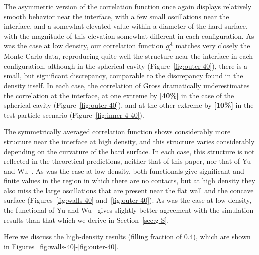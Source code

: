 \documentclass[letterpaper,twocolumn,amsmath,amssymb,jcp,10pt,aip]{revtex4-1}
\newcommand{\red}[1]{{\bf \color{red} #1}}
\newcommand{\fixme}[1]{\red{[#1]}}
\begin{document}
The asymmetric version of the correlation function once again displays
relatively smooth behavior near the interface, with a few small
oscillations near the interface, and a somewhat elevated value within
a diameter of the hard surface, with the magnitude of this elevation
somewhat different in each configuration.  As was the case at low
density, our correlation function $g_\sigma^A$ matches very closely
the Monte Carlo data, reproducing quite well the structure near the
interface in each configuration, although in the spherical cavity
(Figure~\ref{fig:outer-40}), there is a small, but significant
discrepancy, comparable to the discrepancy found in the density
itself.  In each case, the correlation of Gross dramatically
underestimates the correlation at the interface, at one extreme by
\fixme{40\%} in the case of the spherical cavity
(Figure~\ref{fig:outer-40}), and at the other extreme by \fixme{10\%}
in the test-particle scenario (Figure~\ref{fig:inner-4-40}).

The symmetrically averaged correlation function shows considerably
more structure near the interface at high density, and this structure
varies considerably depending on the curvature of the hard surface.
In each case, this structure is not reflected in the theoretical
predictions, neither that of this paper, nor that of Yu and
Wu~\cite{yu2002fmt-dft-inhomogeneous-associating}.  As was the case at
low density, both functionals give significant and finite values in
the region in which there are no contacts, but at high density they
also miss the large oscillations that are present near the flat wall
and the concave surface (Figures~\ref{fig:walls-40}
and~\ref{fig:outer-40}).  As was the case at low density, the
functional of Yu and Wu~\cite{yu2002fmt-dft-inhomogeneous-associating}
gives slightly better agreement with the simulation results than that
which we derive in Section~\ref{sec:g-S}.

Here we discuss the high-density results (filling fraction of 0.4),
which are shown in Figures~\ref{fig:walls-40}-\ref{fig:outer-40}.

\end{document}
